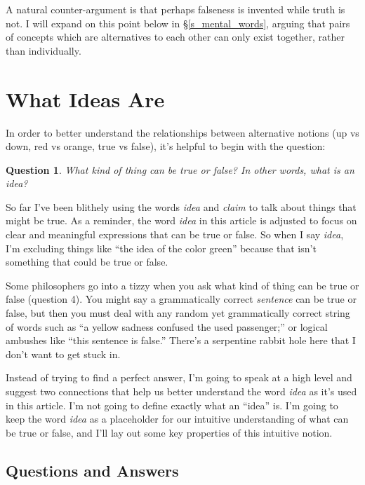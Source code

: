 \documentclass[11pt, oneside]{article}   	%
\newtheorem{question}{Question}
\begin{document}
A natural counter-argument is that perhaps falseness is invented while truth is
not.
I will expand on this point below in \S\ref{s_mental_words},
arguing that pairs of concepts which are alternatives to
each other can only exist together,
rather than individually.

\section{What Ideas Are}

In order to better understand the relationships between alternative
notions (up vs down, red vs orange, true vs false), it's
helpful to begin with the question:
\begin{question}
    What kind of thing can be true or false?
    In other words, what is an idea?
\end{question}

So far I've been blithely using the words {\em idea} and {\em claim} to talk
about things that might be true.
As a reminder, the word {\em idea} in this article is adjusted to focus on
clear and meaningful expressions that can be true or false.
So when I say {\em idea}, I'm excluding
things like ``the idea of the color green'' because that isn't something that
could be true or false.

Some philosophers go into a tizzy when you ask
what kind of thing can be true or false (question 4).
You might say a grammatically correct {\em sentence} can be true or false,
but then you must deal with any random yet grammatically correct string
of words such as
``a yellow sadness confused the used
passenger;'' or logical ambushes like ``this sentence is false.''
There's a serpentine rabbit hole here that I don't want to get stuck in.

Instead of trying to find a perfect answer, I'm going to speak at a high level
and suggest two connections that help us better understand the word {\em idea}
as it's used in this article.
I'm not going to define exactly what an ``idea'' is.
I'm going to keep the word {\em idea} as a placeholder for our
intuitive understanding of what can be true or false, and I'll lay out some key
properties of this intuitive notion.

\subsection{Questions and Answers}
\end{document}
